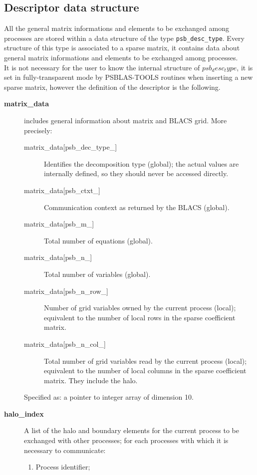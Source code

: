 \subsection{Descriptor data structure}
\label{sec:desc}
All the general matrix informations and elements to be
exchanged among processes are stored within a data structure of the
type \hypertarget{descdata}{{\tt psb\_desc\_type}}. 
Every structure of this type is associated to a sparse matrix, it
contains data about general matrix informations and elements to be
exchanged among processes.  \\ 
It is not necessary for the user to
know the internal structure of $psb_desc_type$, it is set in
fully-transparent mode by PSBLAS-TOOLS routines when inserting a new
sparse matrix, however the definition of the descriptor is the
following.  
\begin{description}
\item[{\bf matrix\_data}] includes general information about matrix and
BLACS grid. More precisely:
\begin{description}
\item[matrix\_data[psb\_dec\_type\_\hbox{]}] Identifies the decomposition type
(global); the actual values are internally defined, so they should
never be accessed directly.
\item[matrix\_data[psb\_ctxt\_\hbox{]}] Communication context as returned by the
BLACS (global).
\item[matrix\_data[psb\_m\_\hbox{]}] Total number of equations (global).
\item[matrix\_data[psb\_n\_\hbox{]}] Total number of variables (global).
\item[matrix\_data[psb\_n\_row\_\hbox{]}] Number of grid variables owned by the
current process (local); equivalent to the number of local rows in the
sparse coefficient matrix.
\item[matrix\_data[psb\_n\_col\_\hbox{]}] Total number of grid variables read by the
current process (local); equivalent to the number of local columns in
the sparse coefficient matrix. They include the halo.
\end{description}
Specified as: a pointer to integer array of dimension 10.
\item[{\bf halo\_index}] A list of the halo and boundary elements for
the current process to be exchanged with other processes; for each
processes with which it is necessary to communicate:
\begin{enumerate}
\item Process identifier;

\end{enumerate}
\end{description}
